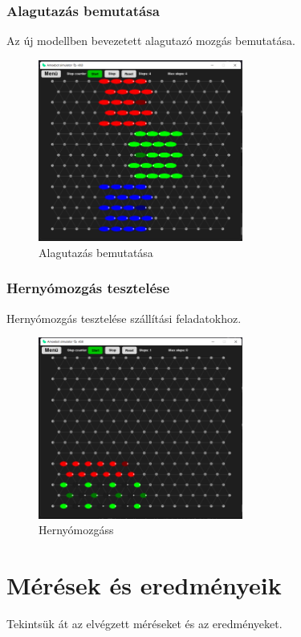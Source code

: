 \documentclass[	
  noindent
]{elteikthesis}[2024/04/26]
\begin{document}
      \subsection{Alagutazás bemutatása}
        Az új modellben bevezetett alagutazó mozgás bemutatása.
      \begin{figure}[H]
      \centering
      \includegraphics[width=0.6\textwidth]{images/simulatons/10_tunel.png}
      \caption{Alagutazás bemutatása}
      \label{fig:10_tunel}
      \end{figure}

      \subsection{Hernyómozgás tesztelése}
        Hernyómozgás tesztelése szállítási feladatokhoz.
      \begin{figure}[H]
      \centering
      \includegraphics[width=0.6\textwidth]{images/simulatons/11_caterpillar.png}
      \caption{Hernyómozgáss}
      \label{fig:11_caterpillar}
      \end{figure}

\chapter{Mérések és eredményeik}
  Tekintsük át az elvégzett méréseket és az eredményeket.
\end{document}
